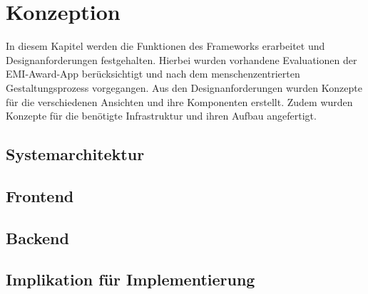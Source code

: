 \chapter{Konzeption}

In diesem Kapitel werden die Funktionen des Frameworks erarbeitet und
Designanforderungen festgehalten. Hierbei wurden vorhandene Evaluationen der
EMI-Award-App berücksichtigt und nach dem menschenzentrierten Gestaltungsprozess
vorgegangen. Aus den Designanforderungen wurden Konzepte für die verschiedenen
Ansichten und ihre Komponenten erstellt. Zudem wurden Konzepte für die benötigte
Infrastruktur und ihren Aufbau angefertigt.

\section{Systemarchitektur}


\section{Frontend}




\section{Backend}




\section{Implikation für Implementierung}

